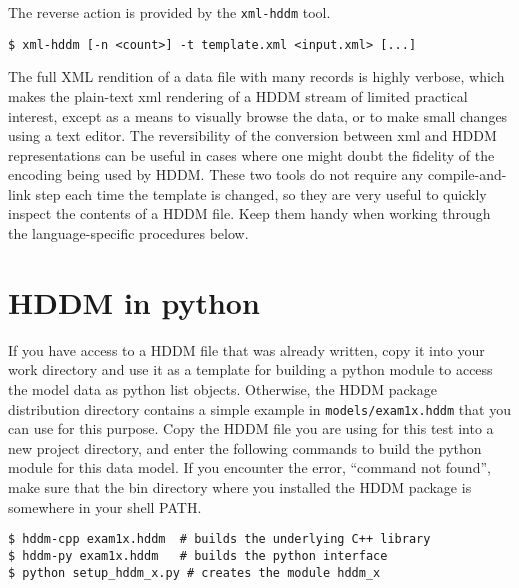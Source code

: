 \documentclass{revtex4}
\begin{document}
The reverse action is provided by the \texttt{xml-{}hddm} tool.

\vspace{0.5cm}
\begin{minipage}{12cm}
\begin{verbatim}
$ xml-hddm [-n <count>] -t template.xml <input.xml> [...]
\end{verbatim}
\end{minipage}
\vspace{0.5cm}

The full XML rendition of a data file with many records is highly verbose,
which makes the plain-text xml rendering of a HDDM stream of limited practical
interest, except as a means to visually browse the data, or to make small changes
using a text editor. The reversibility of the conversion between xml and HDDM
representations can be useful in cases where one might doubt the fidelity of the
encoding being used by HDDM. These two tools do not require any 
compile-{}and-{}link step each time the template is changed, so they are very
useful to quickly inspect the contents of a HDDM file. Keep them handy when
working through the language-{}specific procedures below.

\section{HDDM in python}

If you have access to a HDDM file that was already written, copy it into your
work directory and use it as a template for building a python module to access the
model data as python list objects. Otherwise, the HDDM package distribution directory
contains a simple example in \texttt{models/exam1x.hddm} that you can use for this
purpose. Copy the HDDM file you are using for this test into a new project directory,
and enter the following commands to build the python module for this data model. If
you encounter the error, ``command not found'', make sure that the bin directory
where you installed the HDDM package is somewhere in your shell PATH.

\vspace{0.5cm}
\begin{minipage}{12cm}
\begin{verbatim}
$ hddm-cpp exam1x.hddm  # builds the underlying C++ library
$ hddm-py exam1x.hddm   # builds the python interface
$ python setup_hddm_x.py # creates the module hddm_x
\end{verbatim}
\end{minipage}
\vspace{0.5cm}
\end{document}
